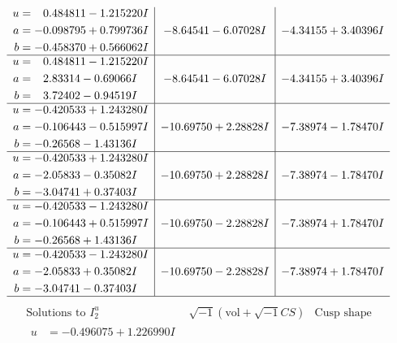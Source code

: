 \documentclass[1p]{elsarticle_modified}
\theoremstyle{definition}
\newcommand{\I}{\sqrt{-1}}
\begin{document}
$$\begin{array}{c|c|c}
\begin{aligned}
u &= \phantom{-}0.484811 - 1.215220 I \\
a &= -0.098795 + 0.799736 I \\
b &= -0.458370 + 0.566062 I\end{aligned}
 & -8.64541 - 6.07028 I & -4.34155 + 3.40396 I \\ \hline\begin{aligned}
u &= \phantom{-}0.484811 - 1.215220 I \\
a &= \phantom{-}2.83314 - 0.69066 I \\
b &= \phantom{-}3.72402 - 0.94519 I\end{aligned}
 & -8.64541 - 6.07028 I & -4.34155 + 3.40396 I \\ \hline\begin{aligned}
u &= -0.420533 + 1.243280 I \\
a &= -0.106443 - 0.515997 I \\
b &= -0.26568 - 1.43136 I\end{aligned}
 & -10.69750 + 2.28828 I & -7.38974 - 1.78470 I \\ \hline\begin{aligned}
u &= -0.420533 + 1.243280 I \\
a &= -2.05833 - 0.35082 I \\
b &= -3.04741 + 0.37403 I\end{aligned}
 & -10.69750 + 2.28828 I & -7.38974 - 1.78470 I \\ \hline\begin{aligned}
u &= -0.420533 - 1.243280 I \\
a &= -0.106443 + 0.515997 I \\
b &= -0.26568 + 1.43136 I\end{aligned}
 & -10.69750 - 2.28828 I & -7.38974 + 1.78470 I \\ \hline\begin{aligned}
u &= -0.420533 - 1.243280 I \\
a &= -2.05833 + 0.35082 I \\
b &= -3.04741 - 0.37403 I\end{aligned}
 & -10.69750 - 2.28828 I & -7.38974 + 1.78470 I\\
 \hline 
 \end{array}$$\newpage$$\begin{array}{c|c|c}  
\text{Solutions to }I^u_{2}& \I (\text{vol} + \sqrt{-1}CS) & \text{Cusp shape}\\
 \hline 
\begin{aligned}
u &= -0.496075 + 1.226990 I \\

\end{aligned}
\end{array}$$
\end{document}
